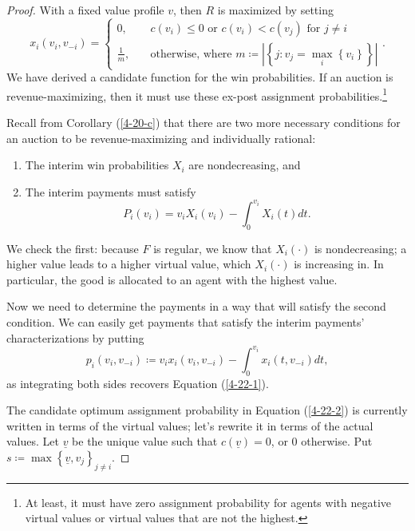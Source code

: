 \begin{proof}
	With a fixed value profile $v$, then $R$ is maximized by setting
	\begin{equation}
		x_i (v_i, v_{-i}) = 
		\begin{cases}
			0, \quad & c(v_i) \le 0 \text{ or } c(v_i) < c(v_j)\text{ for $j \ne i$} \\
			\frac{1}{m}, \quad &\text{otherwise, where } m\coloneqq \left| \left\{j: v_j = \max_i \left\{v_i\right\}\right\} \right|
		\end{cases} \label{4-22-2}
	.\end{equation}
	We have derived a candidate function for the win probabilities. If an auction is revenue-maximizing, then it must use these ex-post assignment probabilities.\footnote{At least, it must have zero assignment probability for agents with negative virtual values or virtual values that are not the highest.}

	Recall from Corollary (\ref{4-20-c}) that there are two more necessary conditions for an auction to be revenue-maximizing and individually rational:
	\begin{enumerate}[label = (\roman*)]
		\item The interim win probabilities $X_i$ are nondecreasing, and
		\item The interim payments must satisfy
			\begin{equation}
				P_i(v_i) = v_i X_i(v_i) - \int_{0}^{v_i} X_i(t)dt 
				 \label{4-22-1}
			.\end{equation}
	\end{enumerate}
	We check the first:
	because $F$ is regular, we know that $X_i(\cdot)$ is nondecreasing; a higher value leads to a higher virtual value, which $X_i(\cdot)$ is increasing in. In particular, the good is allocated to an agent with the highest value.

	Now we need to determine the payments in a way that will satisfy the second condition.
	We can easily get payments that satisfy the interim payments' characterizations by putting \[
		p_i(v_i,v_{-i}) \coloneqq v_ix_i(v_i,v_{-i}) - \int_{0}^{v_i}  x_i(t,v_{-i})dt
	,\] as integrating both sides recovers Equation (\ref{4-22-1}).

	The candidate optimum assignment probability in Equation (\ref{4-22-2}) is currently written in terms of the virtual values; let's rewrite it in terms of the actual values. Let $\underline{v}$ be the unique value such that $c(\underline{v}) = 0$, or $0$ otherwise. Put $s \coloneqq\max \left\{\underline{v}, v_j\right\}_{j \ne i}$.


\end{proof}

